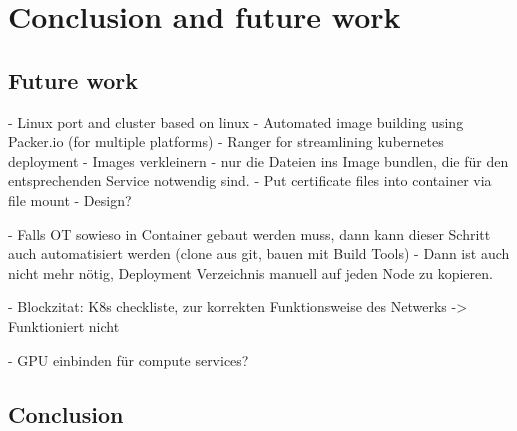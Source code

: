 \chapter{Conclusion and future work} %

\label{chap:conclusion} %




\section{Future work}
- Linux  port and cluster based on linux
- Automated image building using Packer.io (for multiple platforms)
- Ranger for streamlining kubernetes deployment
- Images verkleinern - nur die Dateien ins Image bundlen, die für den entsprechenden Service notwendig sind.
- Put certificate files into container via file mount - Design?

- Falls OT sowieso in Container gebaut werden muss, dann kann dieser Schritt auch automatisiert werden (clone aus git, bauen mit Build Tools)
 - Dann ist auch nicht mehr nötig, Deployment Verzeichnis manuell auf jeden Node zu kopieren.


- Blockzitat: K8s checkliste, zur korrekten Funktionsweise des Netwerks -> Funktioniert nicht

- GPU einbinden für compute services?


\section{Conclusion}